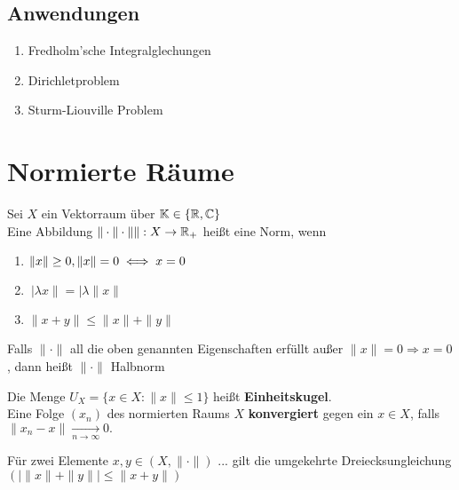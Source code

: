 \subsection{Anwendungen}

\begin{enumerate}
	\item Fredholm'sche Integralglechungen
	\item Dirichletproblem
	\item Sturm-Liouville Problem
\end{enumerate}


\newpage
\section{Normierte Räume}

\begin{definition}
Sei $X$ ein Vektorraum über $\mathbb{K} \in\{ \mathbb{R}, \mathbb{C} \}$ \\
Eine Abbildung  $\| \cdot\| \cdot \| \| : X \rightarrow \mathbb{R}_{+}$ heißt eine Norm, wenn
\begin{enumerate}
	\item $ \| x \| \geq 0, \| x \| = 0 \iff x = 0 $
	\item $\ | \lambda x \| = | \lambda \| x \| $
	\item $ \| x + y \| \leq \| x \| + \| y \| $
\end{enumerate}	
\end{definition}

\begin{bemerkung} Falls $ \| \cdot \| $ all die oben genannten Eigenschaften erfüllt außer $ \| x \| = 0 \Rightarrow x = 0 $, dann heißt $ \| \cdot \| $ Halbnorm
\end{bemerkung}

\begin{vereinbarung} 
Die Menge $ U_{X} = \{ x \in X:  \|x \| \leq 1 \}$ heißt \textbf{Einheitskugel}. \\
Eine Folge $(x_{n})$ des normierten Raums $X$ \textbf{konvergiert} gegen ein $ x \in X $, falls  $\| x_{n} - x \| \xrightarrow[n \rightarrow \infty]{} 0. $	
\end{vereinbarung}


\begin{bemerkung}
Für zwei Elemente $x, y \in (X, \| \cdot \|)$	... gilt die umgekehrte Dreiecksungleichung $( | \|x\| + \|y\| | \leq \| x + y \|)$
\end{bemerkung}

